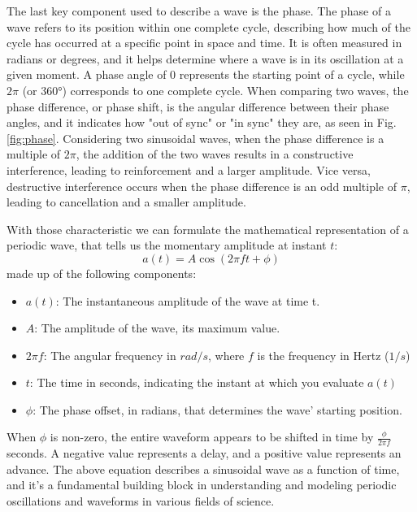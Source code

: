 \documentclass[binding=0.7cm, oneside]{sapthesis}
\begin{document}
The last key component used to describe a wave is the phase. The phase of a wave refers to its position within one complete cycle, describing how much of
the cycle has occurred at a specific point in space and time. It is often measured in radians or degrees, and it helps determine where a wave is in its
oscillation at a given moment. A phase angle of 0 represents the starting point of a cycle, while $2\pi$ (or 360°) corresponds to one complete cycle.
When comparing two waves, the phase difference, or phase shift, is the angular difference between their phase angles, and it indicates how "out of sync"
or "in sync" they are, as seen in Fig. \ref{fig:phase}. Considering two sinusoidal waves, when the phase difference is a multiple of $2\pi$, the addition
of the two waves results in a constructive interference, leading to reinforcement and a larger amplitude. Vice versa, destructive interference occurs when
the phase difference is an odd multiple of $\pi$, leading to cancellation and a smaller amplitude.

With those characteristic we can formulate the mathematical representation of a periodic wave, that tells us the momentary amplitude at instant $t$:
$$ a(t) = A\cos(2\pi ft + \phi) $$
made up of the following components:
\begin{itemize}[itemsep=1.5pt]
    \item $a(t)$: The instantaneous amplitude of the wave at time t.
    \item $A$: The amplitude of the wave, its maximum value.
    \item $2\pi f$: The angular frequency in $rad/s$, where $f$ is the frequency in Hertz ($1/s$)
    \item $t$: The time in seconds, indicating the instant at which you evaluate $a(t)$
    \item $\phi$: The phase offset, in radians, that determines the wave' starting position.
\end{itemize}
When $\phi$ is non-zero, the entire waveform appears to be shifted in time by $\frac{\phi}{2\pi f}$ seconds. A negative value represents a delay,
and a positive value represents an advance. The above equation describes a sinusoidal wave as a function of time, and it's a fundamental building
block in understanding and modeling periodic oscillations and waveforms in various fields of science.
\end{document}
